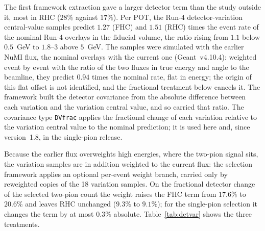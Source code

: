 \documentclass[11pt,a4paper]{article}
\begin{document}
The first framework extraction gave a larger detector term than the study outside it, most in RHC
($28\%$ against $17\%$). Per POT, the Run-4 detector-variation central-value samples predict $1.27$
(FHC) and $1.51$ (RHC) times the event rate of the nominal Run-4 overlays in the fiducial volume, the
ratio rising from $1.1$ below $0.5$~GeV to $1.8$--$3$ above $5$~GeV. The samples were simulated with the
earlier NuMI flux, the nominal overlays with the current one (Geant~v4.10.4): weighted event by event
with the ratio of the two fluxes in true energy and angle to the beamline, they predict $0.94$ times
the nominal rate, flat in energy; the origin of this flat offset is not identified, and the fractional treatment
below cancels it. The framework built the detector covariance from the absolute
difference between each variation and the variation central value, and so carried that ratio. The
covariance type \texttt{DVfrac} applies the fractional change of each variation relative to the
variation central value to the nominal prediction; it is used here and, since version~1.8, in the
single-pion release.

Because the earlier flux overweights high energies, where the two-pion signal sits, the variation
samples are in addition weighted to the current flux: the selection framework applies an optional
per-event weight branch, carried only by reweighted copies of the 18 variation samples. On the
fractional detector change of the selected two-pion count the weight raises the FHC term from $17.6\%$
to $20.6\%$ and leaves RHC unchanged ($9.3\%$ to $9.1\%$); for the single-pion selection it changes the
term by at most $0.3\%$ absolute. Table~\ref{tab:detvar} shows the three treatments.
\end{document}
